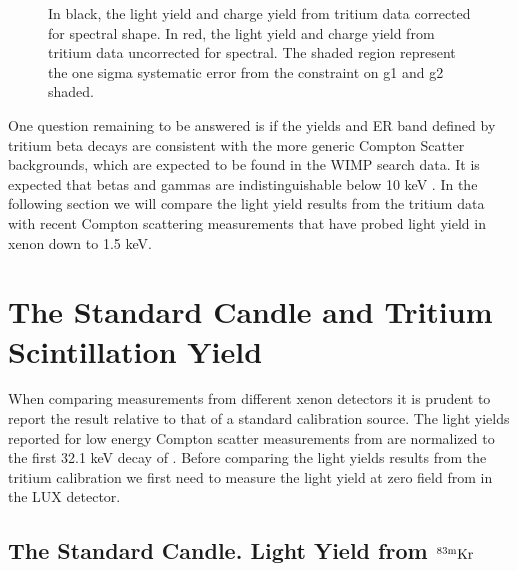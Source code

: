 \begin{figure}[p!]
\caption{In black, the light yield and charge yield from tritium data corrected for spectral shape. In red, the light yield and charge yield from tritium data uncorrected for spectral.  The shaded region represent the one sigma systematic error from the constraint on g1 and g2 shaded. }
\label{fig:LYQY_iter1_comp}
\end{figure}
\renewcommand{\baselinestretch}{2}
\small\normalsize



One question remaining to be answered is if the yields and ER band defined by tritium beta decays are consistent with the more generic Compton Scatter backgrounds, which are expected to be found in the WIMP search data. It is expected that betas and gammas are indistinguishable below 10 keV \cite{NEST} \cite{NEST_2013}. In the following section we will compare the light yield results from the tritium data with recent Compton scattering measurements that have probed light yield in xenon down to 1.5 keV. 




\newpage

\section{The Standard Candle and Tritium Scintillation Yield}

When comparing measurements from different xenon detectors it is prudent to report the result relative to that of a standard calibration source. The light yields reported for low energy Compton scatter measurements from  \cite{Baudis} \cite{Aprile_LY} are normalized to the first 32.1 keV decay of \KrCal. Before comparing the light yields results from the tritium calibration we first need to measure the light yield at zero field from \KrCal  in the LUX detector.

\subsection{The Standard Candle. Light Yield from $\rm^{83m}Kr$}

